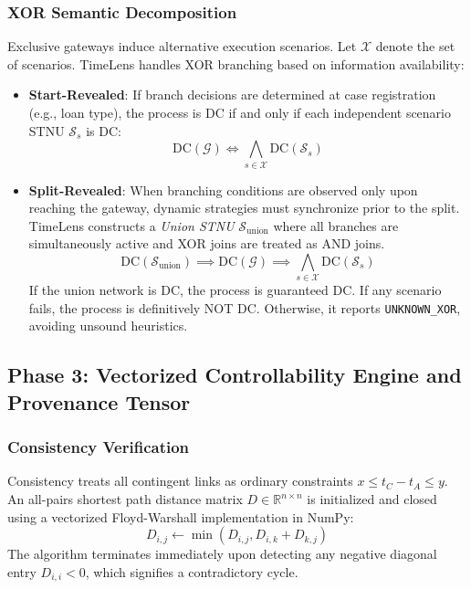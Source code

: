 \documentclass[conference]{IEEEtran}
\begin{document}
\subsubsection{XOR Semantic Decomposition}
Exclusive gateways induce alternative execution scenarios. Let $\mathcal{X}$ denote the set of scenarios. TimeLens handles XOR branching based on information availability:
\begin{itemize}
    \item \textbf{Start-Revealed}: If branch decisions are determined at case registration (e.g., loan type), the process is DC if and only if each independent scenario STNU $\mathcal{S}_s$ is DC:
    \begin{equation}
    \text{DC}(\mathcal{G}) \iff \bigwedge_{s \in \mathcal{X}} \text{DC}(\mathcal{S}_s)
    \end{equation}
    \item \textbf{Split-Revealed}: When branching conditions are observed only upon reaching the gateway, dynamic strategies must synchronize prior to the split. TimeLens constructs a \textit{Union STNU} $\mathcal{S}_{\text{union}}$ where all branches are simultaneously active and XOR joins are treated as AND joins. 
    \begin{equation}
    \text{DC}(\mathcal{S}_{\text{union}}) \implies \text{DC}(\mathcal{G}) \implies \bigwedge_{s \in \mathcal{X}} \text{DC}(\mathcal{S}_s)
    \end{equation}
    If the union network is DC, the process is guaranteed DC. If any scenario fails, the process is definitively NOT DC. Otherwise, it reports \texttt{UNKNOWN\_XOR}, avoiding unsound heuristics.
\end{itemize}

\subsection{Phase 3: Vectorized Controllability Engine and Provenance Tensor}

\subsubsection{Consistency Verification}
Consistency treats all contingent links as ordinary constraints $x \leq t_C - t_A \leq y$. An all-pairs shortest path distance matrix $D \in \mathbb{R}^{n \times n}$ is initialized and closed using a vectorized Floyd-Warshall implementation in NumPy:
\begin{equation}
D_{i,j} \leftarrow \min(D_{i,j}, D_{i,k} + D_{k,j})
\end{equation}
The algorithm terminates immediately upon detecting any negative diagonal entry $D_{i,i} < 0$, which signifies a contradictory cycle.
\end{document}
